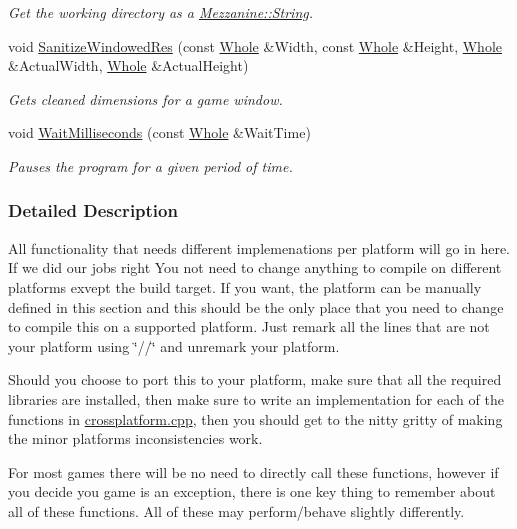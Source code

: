 \begin{DoxyCompactItemize}
\begin{DoxyCompactList}\small\item\em Get the working directory as a \hyperlink{namespaceMezzanine_acf9fcc130e6ebf08e3d8491aebcf1c86}{Mezzanine::String}. \item\end{DoxyCompactList}\item 
void \hyperlink{namespaceMezzanine_1_1crossplatform_a339b18b40eced8ea2b3f6e177aa340d0}{SanitizeWindowedRes} (const \hyperlink{namespaceMezzanine_adcbb6ce6d1eb4379d109e51171e2e493}{Whole} \&Width, const \hyperlink{namespaceMezzanine_adcbb6ce6d1eb4379d109e51171e2e493}{Whole} \&Height, \hyperlink{namespaceMezzanine_adcbb6ce6d1eb4379d109e51171e2e493}{Whole} \&ActualWidth, \hyperlink{namespaceMezzanine_adcbb6ce6d1eb4379d109e51171e2e493}{Whole} \&ActualHeight)
\begin{DoxyCompactList}\small\item\em Gets cleaned dimensions for a game window. \item\end{DoxyCompactList}\item 
void \hyperlink{namespaceMezzanine_1_1crossplatform_aedff57a398f195dceb00081475239db4}{WaitMilliseconds} (const \hyperlink{namespaceMezzanine_adcbb6ce6d1eb4379d109e51171e2e493}{Whole} \&WaitTime)
\begin{DoxyCompactList}\small\item\em Pauses the program for a given period of time. \item\end{DoxyCompactList}\end{DoxyCompactItemize}


\subsubsection{Detailed Description}
All functionality that needs different implemenations per platform will go in here. If we did our jobs right You not need to change anything to compile on different platforms exvept the build target. If you want, the platform can be manually defined in this section and this should be the only place that you need to change to compile this on a supported platform. Just remark all the lines that are not your platform using \char`\"{}//\char`\"{} and unremark your platform. \par
\par
 Should you choose to port this to your platform, make sure that all the required libraries are installed, then make sure to write an implementation for each of the functions in \hyperlink{crossplatform_8cpp_source}{crossplatform.cpp}, then you should get to the nitty gritty of making the minor platforms inconsistencies work. \par
\par
 For most games there will be no need to directly call these functions, however if you decide you game is an exception, there is one key thing to remember about all of these functions. All of these may perform/behave slightly differently. 


